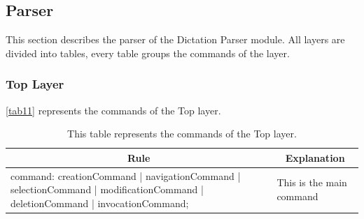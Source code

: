 \subsection{Parser}
This section describes the parser of the Dictation Parser module. All layers are divided into tables, every table groups the commands of the layer.

\subsubsection{Top Layer}
\autoref{tab11} represents the commands of the Top layer.
\begin{table}[H]
\centering
\begin{tabular}{|p{10cm}|l|}
\hline
\multicolumn{1}{|c|}{{\bf Rule}}                                                                                             & \multicolumn{1}{c|}{{\bf Explanation}} \\ \hline
command: creationCommand | navigationCommand | selectionCommand | modificationCommand | deletionCommand | invocationCommand; & This is the main command               \\ \hline
\end{tabular}
\caption{This table represents the commands of the Top layer.}
\label{tab11}
\end{table}

